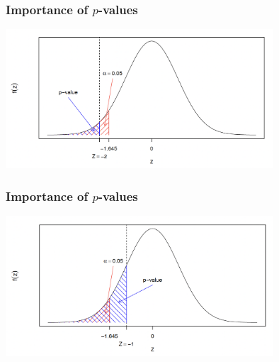 \documentclass[12pt]{beamer}
\begin{document}
\begin{frame}
	\frametitle{Importance of $p$-values}
	
\centering
\includegraphics[width=10cm]{importance1.png}	
	
\end{frame}
\begin{frame}
	\frametitle{Importance of $p$-values}
	
	\centering
	\includegraphics[width=10cm]{importance2.png}	
	
\end{frame}
\end{document}
